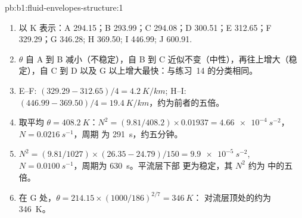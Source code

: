 \begin{solution}{pb:b1:fluid-envelopes-structure:1}
\begin{enumerate}
        为 $\Gamma_d$；上方的层阻止混合继续进行。
  \item 以 K 表示：A 294.15；B 293.99；C 294.08；D 300.51；E 312.65；F 329.29；G
        346.28; H 369.50; I 446.99; J 600.91.
  \item $\theta$ 自 A 到 B 减小（不稳定），自 B 到
        C 近似不变（中性），再往上增大（稳定），自 C 到 D 以及
        G 以上增大最快：与练习~14 的分类相同。
  \item E--F: $(329.29 - 312.65)/4 = \qty{4.2}{K/km}$; H--I: $(446.99 -
        369.50)/4 = \qty{19.4}{K/km}$，约为前者的五倍。
  \item 取平均 $\theta = \qty{408.2}{K}$：$N^2 = (9.81/408.2) \times
        0.01937 = \qty{4.66e-4}{s^{-2}}$，$N = \qty{0.0216}{s^{-1}}$，周期
        为 \qty{291}{s}，约五分钟。
  \item $N^2 = (9.81/1027) \times (26.35 - 24.79)/150 = \qty{9.9e-5}{s^{-2}}$,
        $N = \qty{0.0100}{s^{-1}}$，周期为 \qty{630}{s}。平流层下部
        更为稳定，其 $N^2$ 约为
        中的五倍。
  \item 在 G 处，$\theta = 214.15 \times (1000/186)^{2/7} = \qty{346}{K}$：
        对流层顶处的约为 \qty{346}{K}。
\end{enumerate}
\end{solution}
